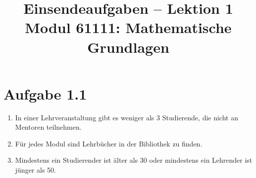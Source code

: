 \documentclass[a4paper,12pt]{article}
\title{Einsendeaufgaben -- Lektion 1\\[0.5em]
\large Modul 61111: Mathematische Grundlagen}
\author{}
\date{}
\begin{document}
\maketitle

\section*{Aufgabe 1.1}

\begin{enumerate}[label=\alph*)]
    \item In einer Lehrveranstaltung gibt es weniger als 3 Studierende,
          die nicht an Mentoren teilnehmen.

    \item Für jedes Modul sind Lehrbücher in der Bibliothek zu finden.

    \item Mindestens ein Studierender ist älter als 30 oder mindestens
          ein Lehrender ist jünger als 50.
\end{enumerate}
\end{document}
